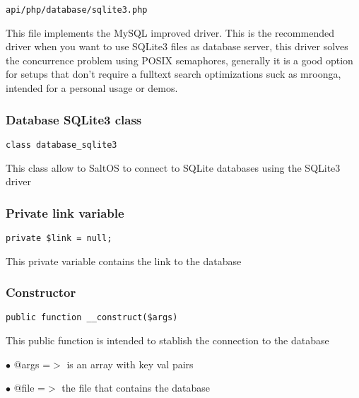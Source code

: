 \documentclass[a4paper]{article}
\begin{document}
\begin{lstlisting}
api/php/database/sqlite3.php
\end{lstlisting}

This file implements the MySQL improved driver. This is the recommended driver when you want
to use SQLite3 files as database server, this driver solves the concurrence problem using
POSIX semaphores, generally it is a good option for setups that don't require a fulltext
search optimizations suck as mroonga, intended for a personal usage or demos.

\hypertarget{toc355}{}
\subsubsection{Database SQLite3 class}

\begin{lstlisting}
class database_sqlite3
\end{lstlisting}

This class allow to SaltOS to connect to SQLite databases using the SQLite3 driver

\hypertarget{toc356}{}
\subsubsection{Private link variable}

\begin{lstlisting}
private $link = null;
\end{lstlisting}

This private variable contains the link to the database

\hypertarget{toc357}{}
\subsubsection{Constructor}

\begin{lstlisting}
public function __construct($args)
\end{lstlisting}

This public function is intended to stablish the connection to the database

\begin{compactitem}
\item[\color{myblue}$\bullet$] @args =$>$ is an array with key val pairs
\item[\color{myblue}$\bullet$] @file =$>$ the file that contains the database
\end{compactitem}
\end{document}
